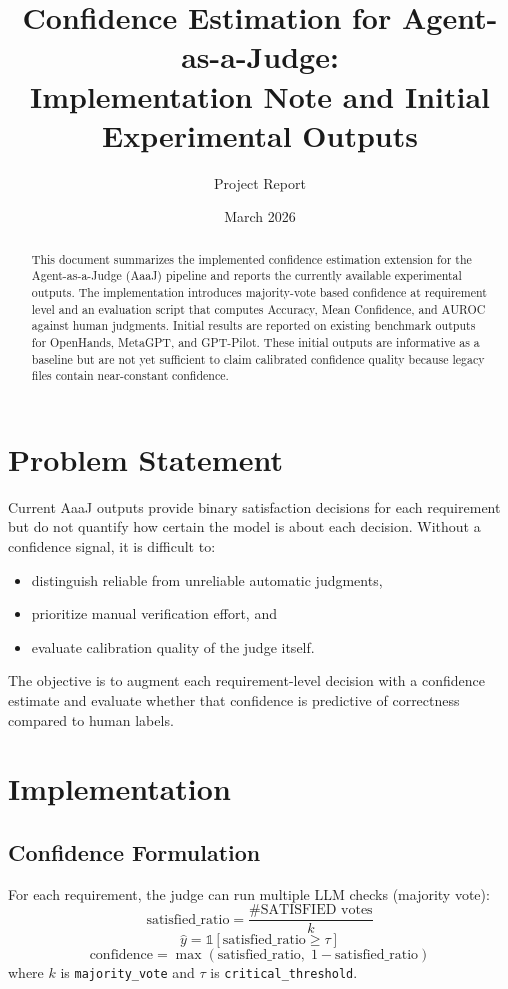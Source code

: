 \documentclass[11pt]{article}
\title{Confidence Estimation for Agent-as-a-Judge: \\
Implementation Note and Initial Experimental Outputs}
\author{Project Report}
\date{March 2026}
\begin{document}
\maketitle

\begin{abstract}
This document summarizes the implemented confidence estimation extension for the Agent-as-a-Judge (AaaJ) pipeline and reports the currently available experimental outputs. The implementation introduces majority-vote based confidence at requirement level and an evaluation script that computes Accuracy, Mean Confidence, and AUROC against human judgments. Initial results are reported on existing benchmark outputs for OpenHands, MetaGPT, and GPT-Pilot. These initial outputs are informative as a baseline but are not yet sufficient to claim calibrated confidence quality because legacy files contain near-constant confidence.
\end{abstract}

\section{Problem Statement}
Current AaaJ outputs provide binary satisfaction decisions for each requirement but do not quantify how certain the model is about each decision. Without a confidence signal, it is difficult to:
\begin{itemize}[leftmargin=*]
    \item distinguish reliable from unreliable automatic judgments,
    \item prioritize manual verification effort, and
    \item evaluate calibration quality of the judge itself.
\end{itemize}
The objective is to augment each requirement-level decision with a confidence estimate and evaluate whether that confidence is predictive of correctness compared to human labels.

\section{Implementation}
\subsection{Confidence Formulation}
For each requirement, the judge can run multiple LLM checks (majority vote):
\begin{equation}
\text{satisfied\_ratio} = \frac{\#\text{SATISFIED votes}}{k}
\end{equation}
\begin{equation}
\hat{y} = \mathbb{1}[\text{satisfied\_ratio} \geq \tau]
\end{equation}
\begin{equation}
\text{confidence} = \max(\text{satisfied\_ratio},\; 1-\text{satisfied\_ratio})
\end{equation}
where $k$ is \texttt{majority\_vote} and $\tau$ is \texttt{critical\_threshold}.
\end{document}
